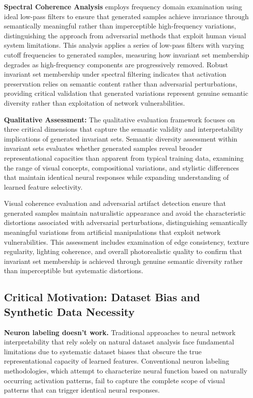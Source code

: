 \textbf{Spectral Coherence Analysis} employs frequency domain examination using ideal low-pass filters to ensure that generated samples achieve invariance through semantically meaningful rather than imperceptible high-frequency variations, distinguishing the approach from adversarial methods that exploit human visual system limitations. This analysis applies a series of low-pass filters with varying cutoff frequencies to generated samples, measuring how invariant set membership degrades as high-frequency components are progressively removed. Robust invariant set membership under spectral filtering indicates that activation preservation relies on semantic content rather than adversarial perturbations, providing critical validation that generated variations represent genuine semantic diversity rather than exploitation of network vulnerabilities.

\textbf{Qualitative Assessment:} The qualitative evaluation framework focuses on three critical dimensions that capture the semantic validity and interpretability implications of generated invariant sets. Semantic diversity assessment within invariant sets evaluates whether generated samples reveal broader representational capacities than apparent from typical training data, examining the range of visual concepts, compositional variations, and stylistic differences that maintain identical neural responses while expanding understanding of learned feature selectivity.

Visual coherence evaluation and adversarial artifact detection ensure that generated samples maintain naturalistic appearance and avoid the characteristic distortions associated with adversarial perturbations, distinguishing semantically meaningful variations from artificial manipulations that exploit network vulnerabilities. This assessment includes examination of edge consistency, texture regularity, lighting coherence, and overall photorealistic quality to confirm that invariant set membership is achieved through genuine semantic diversity rather than imperceptible but systematic distortions.

\subsection{Critical Motivation: Dataset Bias and Synthetic Data Necessity}

\textbf{Neuron labeling doesn't work.} Traditional approaches to neural network interpretability that rely solely on natural dataset analysis face fundamental limitations due to systematic dataset biases that obscure the true representational capacity of learned features. Conventional neuron labeling methodologies, which attempt to characterize neural function based on naturally occurring activation patterns, fail to capture the complete scope of visual patterns that can trigger identical neural responses.

